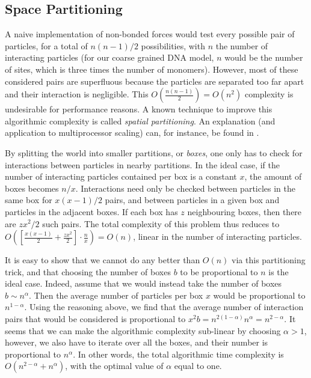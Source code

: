 \subsection{Space Partitioning}

A naive implementation of non-bonded forces would test every possible pair of particles, for a total of $n(n-1)/2$ possibilities, with $n$ the number of interacting particles (for our coarse grained DNA model, $n$ would be the number of sites, which is three times the number of monomers).
However, most of these considered pairs are superfluous because the particles are separated too far apart and their interaction is negligible. This $O\left(\frac{n(n-1)}{2}\right) = O(n^2)$ complexity is undesirable for performance reasons.
A known technique to improve this algorithmic complexity is called \emph{spatial partitioning}. An explanation (and application to multiprocessor scaling) can, for instance, be found in \cite{plimpton1995fast}.

By splitting the world into smaller partitions, or \emph{boxes}, one only has to check for interactions between particles in nearby partitions.
In the ideal case, if the number of interacting particles contained per box is a constant $x$, the amount of boxes becomes $n/x$. Interactions need only be checked between particles in the same box for $x(x-1)/2$ pairs, and between particles in a given box and particles in the adjacent boxes. If each box has $z$ neighbouring boxes, then there are $zx^2/2$ such pairs. The total complexity of this problem thus reduces to 
$O\left(
	\left[ \frac{x(x-1)}{2} + \frac{zx^2}{2} \right]
		\cdot \frac{n}{x}
\right) = O(n)$,
linear in the number of interacting particles.

It is easy to show that we cannot do any better than $O(n)$ via this partitioning trick, and that choosing the number of boxes $b$ to be proportional to $n$ is the ideal case.
Indeed, assume that we would instead take the number of boxes $b \sim n^\alpha$. Then the average number of particles per box $x$ would be proportional to $n^{1 - \alpha}$. Using the reasoning above, we find that the average number of interaction pairs that would be considered is proportional to $x^2 b = n^{2(1 - \alpha)} n^\alpha = n^{2 -\alpha}$. It seems that we can make the algorithmic complexity sub-linear by choosing $\alpha > 1$, however, we also have to iterate over all the boxes, and their number is proportional to $n^\alpha$. In other words, the total algorithmic time complexity is $O(n^{2 - \alpha} + n^\alpha)$, with the optimal value of $\alpha$ equal to one.


